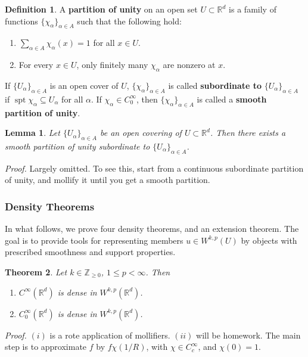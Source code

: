 \documentclass[letterpaper,10pt]{article}
\newcommand{\wkp}{W^{k,p}}
\DeclareMathOperator{\spt}{spt}
\theoremstyle{definition}
\newtheorem{dfn}{Definition}
\theoremstyle{remark}
\theoremstyle{plain}
\newtheorem{thm}{Theorem}[section]
\newtheorem{lem}[thm]{Lemma}
\renewenvironment{proof}{
    \vspace{5pt}
    \begin{mdframed}[bottomline=false,topline=false,rightline=false, skipabove=0]
    \noindent\textit{Proof.}}
{
    \hspace{\fill}\qedsymbol
    \end{mdframed}
}
\begin{document}
\begin{dfn}\label{dfn:parunity}
    A \textbf{partition of unity} on an open set $U\subset\mathbb R^d$ is a family of 
    functions $\{\chi_\alpha\}_{\alpha\in A}$ such that the following hold:
    \begin{enumerate}[nosep]
        \item $\sum_{\alpha\in A}^{}\chi_\alpha(x)=1$ for all $x\in U$.
        \item For every $x\in U$, only finitely many $\chi_\alpha$ are nonzero at $x$.
    \end{enumerate}
    If $\{U_\alpha\}_{\alpha\in A}$ is an open cover of $U$, $\{\chi_\alpha\}_{\alpha\in A}$
    is called \textbf{subordinate to} $\{U_\alpha\}_{\alpha\in A}$ if $\spt\chi_\alpha\subseteq U_\alpha$
    for all $\alpha$.
    If $\chi_\alpha\in C^{\infty}_0$, then $\{\chi_\alpha\}_{\alpha\in A}$ is called
    a \textbf{smooth partition of unity}.
\end{dfn}
\begin{lem}
    Let $\{U_\alpha\}_{\alpha\in A}$ be an open covering of $U\subset\mathbb R^d$.
    Then there exists a smooth partition of unity subordinate to $\{U_\alpha\}_{\alpha\in A}$.
\end{lem}
\begin{proof}
    Largely omitted. To see this, start from a continuous subordinate partition of 
    unity, and mollify it until you get a smooth partition.
\end{proof}

\subsubsection{Density Theorems}
In what follows, we prove four density theorems, and an extension theorem.
The goal is to provide tools for representing members $u\in W^{k,p}(U)$
by objects with prescribed smoothness and support properties.

\begin{thm}\label{thm:density1}
    Let $k\in\mathbb Z_{\geq 0}$, $1\leq p<\infty$. Then
    \begin{enumerate}[label=\roman*.]
        \item $C^\infty(\mathbb R^d)$ is dense in $\wkp(\mathbb R^d)$.
        \item $C^\infty_0(\mathbb R^d)$ is dense in $\wkp(\mathbb R^d)$.
    \end{enumerate}
\end{thm}
\begin{proof} %
    $(i)$ is a rote application of mollifiers. $(ii)$ will be homework. The
    main step is to approximate $f$ by $f\chi(1/R)$, with $\chi\in C_c^\infty$,
    and $\chi(0)=1$.
\end{proof}
\end{document}

